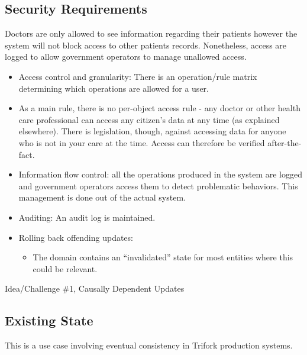 \documentclass[11pt,a4paper]{report}
\begin{document}
\subsection{Security Requirements}
Doctors are only allowed to see information regarding their patients however the system will not block access to other patients records. Nonetheless, access are logged to allow government operators to manage unallowed access.
\begin{itemize}
	\item Access control and granularity: There is an operation/rule matrix determining which operations are allowed for a user.
	\item As a main rule, there is no per-object access rule - any doctor or other health care professional can access any citizen's data at any time (as explained elsewhere). There is legislation, though, against accessing data for anyone who is not in your care at the time. Access can therefore be verified after-the-fact.
	\item Information flow control: all the operations produced in the system are logged and government operators access them to detect problematic behaviors. This management is done out of the actual system. 
	\item Auditing: An audit log is maintained.
	\item Rolling back offending updates:
	\begin{itemize}
		\item[] The domain contains an ``invalidated'' state for most entities where this could be relevant.
	\end{itemize}
\end{itemize}
Idea/Challenge \#1, Causally Dependent Updates

\subsection{Existing State}
This is a use case involving eventual consistency in Trifork production systems.
\end{document}
